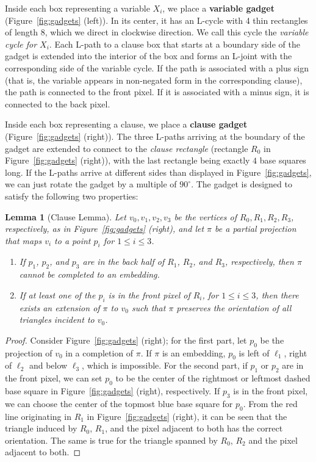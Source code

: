 \documentclass[12pt]{article}
\newtheorem{lemma}[theorem]{Lemma}
\begin{document}
Inside each box representing a variable $X_i$, we place a \textbf{variable gadget} 
(Figure~\ref{fig:gadgets} (left)).
In its center, it has an L-cycle with 4 thin rectangles of length $8$,
which we direct in clockwise direction.
We call this cycle the \emph{variable cycle for $X_i$}.
Each L-path to a clause box that starts at a boundary side of the gadget is extended
into the interior of the box and forms an L-joint with 
the corresponding side of the variable cycle.
If the path is associated with a plus sign (that is,
the variable appears in non-negated form in the corresponding clause), the path
is connected to the front pixel. If it is associated with a minus sign, it is connected
to the back pixel. 

Inside each box representing a clause, we place a \textbf{clause gadget}
(Figure~\ref{fig:gadgets} (right)).
The three L-paths arriving at the boundary of the gadget are extended to connect
to the \emph{clause rectangle} (rectangle $R_0$ in Figure~\ref{fig:gadgets} (right)), 
with the last rectangle being exactly $4$ base squares long.
If the L-paths arrive at different sides than displayed in 
Figure~\ref{fig:gadgets}, we can just rotate the gadget by a multiple of $90^\circ$.
The gadget is designed to satisfy the following two properties:

\begin{lemma}[Clause Lemma]\label{lem:clause_lemma}
Let $v_0,v_1,v_2,v_3$ be the vertices of $R_0,R_1,R_2,R_3$,
respectively, 
as in Figure~\ref{fig:gadgets} (right), and let $\pi$ be
a partial projection that maps $v_i$ to a point $p_i$ for $1\leq i\leq 3$.
\begin{enumerate}
\item If $p_1$, $p_2$, and $p_3$ are in the back half
of $R_1$, $R_2$, and $R_3$, respectively, then $\pi$ cannot be completed to an embedding.
\item If at least one of the $p_i$ is in the front pixel of $R_i$, for $1\leq i\leq 3$, 
then there exists an extension of $\pi$ to $v_0$
such that $\pi$ preserves the orientation of all triangles incident to $v_0$.
\end{enumerate}
\end{lemma}
\begin{proof}
Consider Figure~\ref{fig:gadgets} (right);
for the first part, let $p_0$ be the projection of $v_0$ in a completion of $\pi$. 
If $\pi$ is an embedding, $p_0$ is left of $\ell_1$,
right of $\ell_2$ and below $\ell_3$, which is impossible.
For the second part, if $p_1$ or $p_2$ are in the front pixel,
we can set $p_0$ to be the center of the rightmost or leftmost dashed base square in 
Figure~\ref{fig:gadgets} (right), respectively. If $p_3$ is in the front pixel, we can
choose the center of the topmost blue base square for $p_0$. From the red line
originating in $R_1$ in Figure~\ref{fig:gadgets} (right), it can be seen that the triangle
induced by $R_0$, $R_1$, and the pixel adjacent to both has the correct orientation.
The same is true for the triangle spanned by $R_0$, $R_2$ and the pixel
adjacent to both.
\end{proof}
\end{document}
